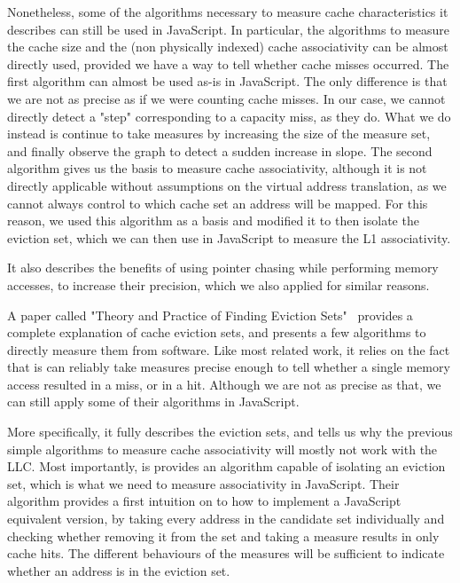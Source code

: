 \documentclass[a4paper,11pt,oneside]{report}
\begin{document}
Nonetheless, some of the algorithms necessary to measure cache characteristics it describes can still be used in JavaScript. In particular, the algorithms to measure the cache size and the (non physically indexed) cache associativity can be almost directly used, provided we have a way to tell whether cache misses occurred. The first algorithm can almost be used as-is in JavaScript. The only difference is that we are not as precise as if we were counting cache misses. In our case, we cannot directly detect a "step" corresponding to a capacity miss, as they do. What we do instead is continue to take measures by increasing the size of the measure set, and finally observe the graph to detect a sudden increase in slope. The second algorithm gives us the basis to measure cache associativity, although it is not directly applicable without assumptions on the virtual address translation, as we cannot always control to which cache set an address will be mapped. For this reason, we used this algorithm as a basis and modified it to then isolate the eviction set, which we can then use in JavaScript to measure the L1 associativity.

It also describes the benefits of using pointer chasing while performing memory accesses, to increase their precision, which we also applied for similar reasons.


A paper called "Theory and Practice of Finding Eviction Sets"~\cite{eviction_sets} provides a complete explanation of cache eviction sets, and presents a few algorithms to directly measure them from software. Like most related work, it relies on the fact that is can reliably take measures precise enough to tell whether a single memory access resulted in a miss, or in a hit. Although we are not as precise as that, we can still apply some of their algorithms in JavaScript.

More specifically, it fully describes the eviction sets, and tells us why the previous simple algorithms to measure cache associativity will mostly not work with the LLC. Most importantly, is provides an algorithm capable of isolating an eviction set, which is what we need to measure associativity in JavaScript. Their algorithm provides a first intuition on to how to implement a JavaScript equivalent version, by taking every address in the candidate set individually and checking whether removing it from the set and taking a measure results in only cache hits. The different behaviours of the measures will be sufficient to indicate whether an address is in the eviction set.
\end{document}

